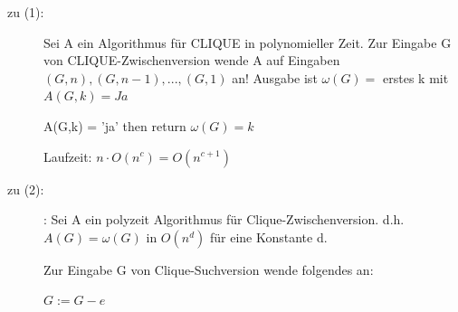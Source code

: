 \documentclass{article} %
\begin{document}
\begin{description}
\item[zu (1):] Sei A ein Algorithmus für CLIQUE in polynomieller Zeit.
Zur Eingabe G von CLIQUE-Zwischenversion wende A auf Eingaben $(G,n), (G,n-1),...,(G,1)$ an!
Ausgabe ist $\omega (G) =$ erstes k mit $A(G,k) = Ja$

\begin{algorithmic}[1]
	\If A(G,k) = 'ja'
	then return $\omega (G) = k $
	\EndIf
\EndFor
\end{algorithmic}
Laufzeit: $n \cdot O(n^c) = O(n^{c+1})$


\item[zu (2):]: Sei A ein polyzeit Algorithmus für Clique-Zwischenversion.
d.h. $A(G) = \omega (G)$ in $O(n^d)$ für eine Konstante d.

Zur Eingabe G von Clique-Suchversion wende folgendes an:
\begin{algorithmic}[1]
	 $G := G - e$
	\EndIf
\EndFor
\State {}
\end{algorithmic}
\end{description}
\end{document}
